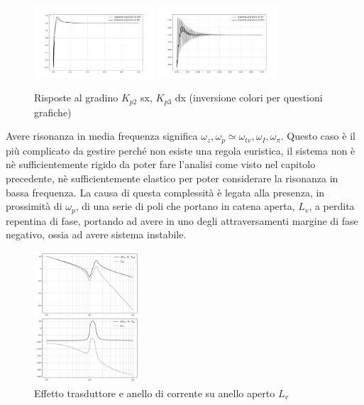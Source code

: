 \begin{figure}[h]
    \centering
    \includegraphics[width=0.4\textwidth]{Immagini/step_response_Kp2.png}
    \includegraphics[width=0.4\textwidth]{Immagini/step_response_Kp3.png}
    \caption{Risposte al gradino \(K_{p2}\) sx, \(K_{p3}\) dx (inversione colori per questioni grafiche)}
\end{figure}

Avere risonanza in media frequenza significa \(\omega_z,\omega_p \simeq \omega_{tv},\omega_I,\omega_\pi\). Questo caso è il più complicato da gestire perché non esiste una regola euristica, il sistema non è nè sufficientemente rigido da poter fare l'analisi come visto nel capitolo precedente, nè sufficientemente elastico per poter considerare la risonanza in bassa frequenza.
La causa di questa complessità è legata alla presenza, in prossimità di \(\omega_p\), di una serie di poli che portano in catena aperta, \(L_v\), a perdita repentina di fase, portando ad avere in uno degli attraversamenti margine di fase negativo, ossia ad avere sistema instabile.

\begin{figure}[h]
    \centering
    \includegraphics[width=0.35\textwidth]{Immagini/risonanza_media_f_Gvm_vs_Lv.png}
    \caption{Effetto trasduttore e anello di corrente su anello aperto \(L_v\)}
\end{figure}

